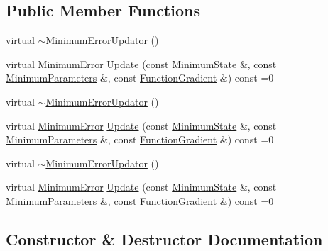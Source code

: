 \subsection*{Public Member Functions}
\begin{DoxyCompactItemize}
\item 
virtual \mbox{\hyperlink{classROOT_1_1Minuit2_1_1MinimumErrorUpdator_aae3f2641888e9c351f256a83c455d207}{$\sim$\+Minimum\+Error\+Updator}} ()
\item 
virtual \mbox{\hyperlink{classROOT_1_1Minuit2_1_1MinimumError}{Minimum\+Error}} \mbox{\hyperlink{classROOT_1_1Minuit2_1_1MinimumErrorUpdator_ae75c33152c49ebf34e6119adc0bbbda9}{Update}} (const \mbox{\hyperlink{classROOT_1_1Minuit2_1_1MinimumState}{Minimum\+State}} \&, const \mbox{\hyperlink{classROOT_1_1Minuit2_1_1MinimumParameters}{Minimum\+Parameters}} \&, const \mbox{\hyperlink{classROOT_1_1Minuit2_1_1FunctionGradient}{Function\+Gradient}} \&) const =0
\item 
virtual \mbox{\hyperlink{classROOT_1_1Minuit2_1_1MinimumErrorUpdator_aae3f2641888e9c351f256a83c455d207}{$\sim$\+Minimum\+Error\+Updator}} ()
\item 
virtual \mbox{\hyperlink{classROOT_1_1Minuit2_1_1MinimumError}{Minimum\+Error}} \mbox{\hyperlink{classROOT_1_1Minuit2_1_1MinimumErrorUpdator_ae75c33152c49ebf34e6119adc0bbbda9}{Update}} (const \mbox{\hyperlink{classROOT_1_1Minuit2_1_1MinimumState}{Minimum\+State}} \&, const \mbox{\hyperlink{classROOT_1_1Minuit2_1_1MinimumParameters}{Minimum\+Parameters}} \&, const \mbox{\hyperlink{classROOT_1_1Minuit2_1_1FunctionGradient}{Function\+Gradient}} \&) const =0
\item 
virtual \mbox{\hyperlink{classROOT_1_1Minuit2_1_1MinimumErrorUpdator_aae3f2641888e9c351f256a83c455d207}{$\sim$\+Minimum\+Error\+Updator}} ()
\item 
virtual \mbox{\hyperlink{classROOT_1_1Minuit2_1_1MinimumError}{Minimum\+Error}} \mbox{\hyperlink{classROOT_1_1Minuit2_1_1MinimumErrorUpdator_ae75c33152c49ebf34e6119adc0bbbda9}{Update}} (const \mbox{\hyperlink{classROOT_1_1Minuit2_1_1MinimumState}{Minimum\+State}} \&, const \mbox{\hyperlink{classROOT_1_1Minuit2_1_1MinimumParameters}{Minimum\+Parameters}} \&, const \mbox{\hyperlink{classROOT_1_1Minuit2_1_1FunctionGradient}{Function\+Gradient}} \&) const =0
\end{DoxyCompactItemize}


\subsection{Constructor \& Destructor Documentation}
\mbox{\label{classROOT_1_1Minuit2_1_1MinimumErrorUpdator_aae3f2641888e9c351f256a83c455d207}} 
